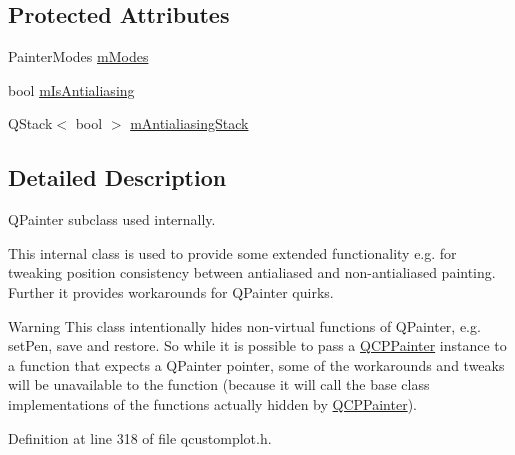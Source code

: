 \subsection*{Protected Attributes}
\begin{DoxyCompactItemize}
\item 
Painter\-Modes \hyperlink{class_q_c_p_painter_af5d1d6e5df0adbc7de5633250fb3396c}{m\-Modes}
\item 
bool \hyperlink{class_q_c_p_painter_a7055085da176aee0f6b23298f1003d08}{m\-Is\-Antialiasing}
\item 
Q\-Stack$<$ bool $>$ \hyperlink{class_q_c_p_painter_a0189e641bbf7dc31ac15aef7b36501fa}{m\-Antialiasing\-Stack}
\end{DoxyCompactItemize}


\subsection{Detailed Description}
Q\-Painter subclass used internally. 

This internal class is used to provide some extended functionality e.\-g. for tweaking position consistency between antialiased and non-\/antialiased painting. Further it provides workarounds for Q\-Painter quirks.

\begin{DoxyWarning}{Warning}
This class intentionally hides non-\/virtual functions of Q\-Painter, e.\-g. set\-Pen, save and restore. So while it is possible to pass a \hyperlink{class_q_c_p_painter}{Q\-C\-P\-Painter} instance to a function that expects a Q\-Painter pointer, some of the workarounds and tweaks will be unavailable to the function (because it will call the base class implementations of the functions actually hidden by \hyperlink{class_q_c_p_painter}{Q\-C\-P\-Painter}). 
\end{DoxyWarning}


Definition at line 318 of file qcustomplot.\-h.



